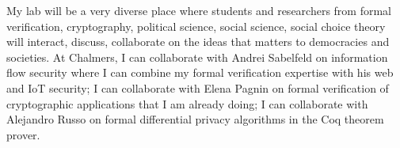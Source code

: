 \documentclass[a4paper]{article}
\begin{document}
My lab will be a very diverse place where students and researchers from formal 
verification, cryptography, 
political science, social science, social choice theory will interact, discuss, 
collaborate on the ideas that matters to democracies and societies. At Chalmers, 
I can collaborate with Andrei Sabelfeld on information flow security where 
I can combine my formal verification expertise with his web and IoT security;
I can collaborate with Elena Pagnin on formal verification of cryptographic 
applications that I am already doing; I can collaborate with 
Alejandro Russo on formal differential privacy algorithms in the Coq 
theorem prover. 
\end{document}
